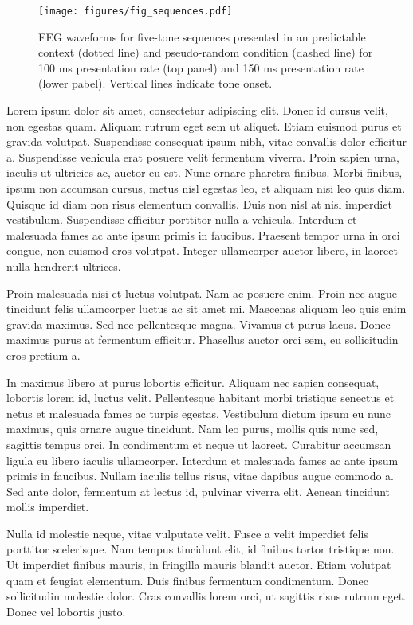 \documentclass[stu,a4paper,12pt, nofontenc, babel, american]{apa7}
\begin{document}
\begin{figure}
\hypertarget{fig:sequences}{%
\centering
\texttt{[image: figures/fig\_sequences.pdf]}
\caption{EEG waveforms for five-tone sequences presented in an
predictable context (dotted line) and pseudo-random condition (dashed
line) for 100 ms presentation rate (top panel) and 150 ms presentation
rate (lower pabel). Vertical lines indicate tone
onset.}\label{fig:sequences}
}
\end{figure}

Lorem ipsum dolor sit amet, consectetur adipiscing elit. Donec id cursus
velit, non egestas quam. Aliquam rutrum eget sem ut aliquet. Etiam
euismod purus et gravida volutpat. Suspendisse consequat ipsum nibh,
vitae convallis dolor efficitur a. Suspendisse vehicula erat posuere
velit fermentum viverra. Proin sapien urna, iaculis ut ultricies ac,
auctor eu est. Nunc ornare pharetra finibus. Morbi finibus, ipsum non
accumsan cursus, metus nisl egestas leo, et aliquam nisi leo quis diam.
Quisque id diam non risus elementum convallis. Duis non nisl at nisl
imperdiet vestibulum. Suspendisse efficitur porttitor nulla a vehicula.
Interdum et malesuada fames ac ante ipsum primis in faucibus. Praesent
tempor urna in orci congue, non euismod eros volutpat. Integer
ullamcorper auctor libero, in laoreet nulla hendrerit ultrices.

Proin malesuada nisi et luctus volutpat. Nam ac posuere enim. Proin nec
augue tincidunt felis ullamcorper luctus ac sit amet mi. Maecenas
aliquam leo quis enim gravida maximus. Sed nec pellentesque magna.
Vivamus et purus lacus. Donec maximus purus at fermentum efficitur.
Phasellus auctor orci sem, eu sollicitudin eros pretium a.

In maximus libero at purus lobortis efficitur. Aliquam nec sapien
consequat, lobortis lorem id, luctus velit. Pellentesque habitant morbi
tristique senectus et netus et malesuada fames ac turpis egestas.
Vestibulum dictum ipsum eu nunc maximus, quis ornare augue tincidunt.
Nam leo purus, mollis quis nunc sed, sagittis tempus orci. In
condimentum et neque ut laoreet. Curabitur accumsan ligula eu libero
iaculis ullamcorper. Interdum et malesuada fames ac ante ipsum primis in
faucibus. Nullam iaculis tellus risus, vitae dapibus augue commodo a.
Sed ante dolor, fermentum at lectus id, pulvinar viverra elit. Aenean
tincidunt mollis imperdiet.

Nulla id molestie neque, vitae vulputate velit. Fusce a velit imperdiet
felis porttitor scelerisque. Nam tempus tincidunt elit, id finibus
tortor tristique non. Ut imperdiet finibus mauris, in fringilla mauris
blandit auctor. Etiam volutpat quam et feugiat elementum. Duis finibus
fermentum condimentum. Donec sollicitudin molestie dolor. Cras convallis
lorem orci, ut sagittis risus rutrum eget. Donec vel lobortis justo.
\end{document}
